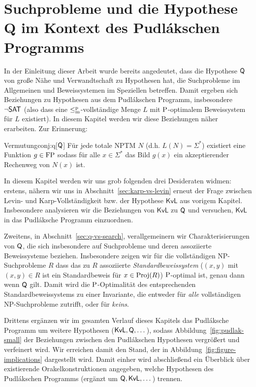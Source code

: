 \chapter{Suchprobleme und die Hypothese Q im Kontext des Pudlákschen Programms}\label{chap:pudlak}


In der Einleitung dieser Arbeit wurde bereits angedeutet, dass die Hypothese $\hQ$ von \citeauthor{fenner_inverting_2003} große Nähe und Verwandtschaft zu Hypothesen hat, die Suchprobleme im Allgemeinen und Beweissystemen im Speziellen betreffen. Damit ergeben sich Beziehungen zu Hypothesen aus dem Pudlákschen Programm, insbesondere $\neg\hSAT$ (also dass eine $\leqmp$-vollständige Menge $L$ mit $\P$-optimalem Beweissystem für $L$ existiert).
In diesem Kapitel werden wir diese Beziehungen näher erarbeiten. Zur Erinnerung:

\begin{reptheorem}{Vermutung}{conj:q}[$\hQ$]
    Für jede totale NPTM $N$ (d.h. $L(N)=\Sigma^*$) existiert eine Funktion $g\in\FP$ sodass für alle $x\in\Sigma^*$ das Bild $g(x)$ ein akzeptierender Rechenweg von $N(x)$ ist. 
\end{reptheorem}


In diesem Kapitel werden wir uns grob folgenden drei Desideraten widmen: 
erstens, nähern wir uns in Abschnitt~\ref{sec:karp-vs-levin} erneut der Frage zwischen Levin- und Karp-Vollständigkeit bzw. der Hypothese $\mathsf{KvL}$ aus vorigem Kapitel. Insbesondere analysieren wir die Beziehungen von $\mathsf{KvL}$ zu $\hQ$ und versuchen, $\mathsf{KvL}$ in das Pudláksche Programm einzuordnen.

Zweitens, in Abschnitt~\ref{sec:q-vs-search}, verallgemeinern wir Charakterisierungen von $\hQ$, die sich insbesondere auf Suchprobleme und deren assoziierte Beweissysteme beziehen.
Insbesondere zeigen wir für die vollständigen NP-Suchprobleme $R$ dass das zu $R$ assoziierte \emph{Standardbeweissystem} ($(x,y)$ mit $(x,y)\in R$ ist ein Standardbeweis für $x\in\Proj(R)$) $\P$-optimal ist, genau dann wenn $\hQ$ gilt. Damit wird die $\P$-Optimalität des entsprechenden Standardbeweissystems zu einer Invariante, die entweder für \emph{alle} vollständigen NP-Suchprobleme zutrifft, oder für \emph{keins}.


Drittens ergänzen wir im gesamten Verlauf dieses Kapitels das Pudláksche Programm um weitere Hypothesen ($\mathsf{KvL}, \hQ, \dots$), sodass Abbildung~\ref{fig:pudlak-small} der Beziehungen zwischen den Pudlákschen Hypothesen vergrößert und verfeinert wird. Wir erreichen damit den Stand, der in Abbildung~\ref{fig:figure-implications} dargestellt wird.
Damit einher wird abschließend ein Überblick über existierende Orakelkonstruktionen angegeben, welche Hypothesen des Pudlákschen Programms (ergänzt um $\hQ, \mathsf{KvL}, \dots$) trennen.


